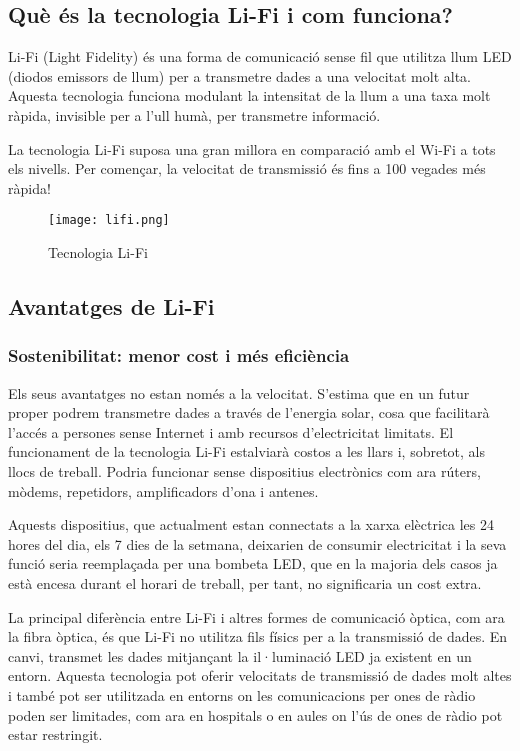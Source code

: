 
\subsection*{Què és la tecnologia Li-Fi i com funciona?}

Li-Fi (Light Fidelity) és una forma de comunicació sense fil que utilitza llum LED (diodos emissors de llum) per a transmetre dades a una velocitat molt alta. Aquesta tecnologia funciona modulant la intensitat de la llum a una taxa molt ràpida, invisible per a l'ull humà, per transmetre informació.

La tecnologia Li-Fi suposa una gran millora en comparació amb el Wi-Fi a tots els nivells. Per començar, la velocitat de transmissió és fins a 100 vegades més ràpida!

\begin{figure}[h!]
    \centering
    \texttt{[image: lifi.png]}
    \caption{Tecnologia Li-Fi}
\end{figure}


\subsection*{Avantatges de Li-Fi}

\subsubsection*{Sostenibilitat: menor cost i més eficiència}

Els seus avantatges no estan només a la velocitat. S'estima que en un futur proper podrem transmetre dades a través de l'energia solar, cosa que facilitarà l'accés a persones sense Internet i amb recursos d'electricitat limitats. El funcionament de la tecnologia Li-Fi estalviarà costos a les llars i, sobretot, als llocs de treball. Podria funcionar sense dispositius electrònics com ara rúters, mòdems, repetidors, amplificadors d'ona i antenes.

Aquests dispositius, que actualment estan connectats a la xarxa elèctrica les 24 hores del dia, els 7 dies de la setmana, deixarien de consumir electricitat i la seva funció seria reemplaçada per una bombeta LED, que en la majoria dels casos ja està encesa durant el horari de treball, per tant, no significaria un cost extra.

La principal diferència entre Li-Fi i altres formes de comunicació òptica, com ara la fibra òptica, és que Li-Fi no utilitza fils físics per a la transmissió de dades. En canvi, transmet les dades mitjançant la il·luminació LED ja existent en un entorn. Aquesta tecnologia pot oferir velocitats de transmissió de dades molt altes i també pot ser utilitzada en entorns on les comunicacions per ones de ràdio poden ser limitades, com ara en hospitals o en aules on l'ús de ones de ràdio pot estar restringit.

